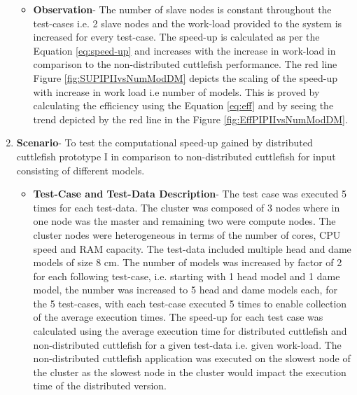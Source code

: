 \begin{enumerate}
\begin{itemize}
\item{\textbf{Observation}}- The number of slave nodes is constant throughout the test-cases i.e. 2 slave nodes and the work-load provided to the system is increased for every test-case. The speed-up is calculated as per the Equation \ref{eq:speed-up} and increases with the increase in work-load in comparison to the non-distributed cuttlefish performance. The red line Figure \ref{fig:SUPIPIIvsNumModDM} depicts the scaling of the speed-up with increase in work load i.e number of models. This is proved by calculating the efficiency using the Equation \ref{eq:eff} and by seeing the trend depicted by the red line in the Figure \ref{fig:EffPIPIIvsNumModDM}. 
\end{itemize}

\item{\textbf{Scenario}}- To test the computational speed-up gained by distributed cuttlefish prototype I in comparison to non-distributed cuttlefish for input consisting of different models.
\begin{itemize}
\item{\textbf{Test-Case and Test-Data Description}}- The test case was executed 5 times for each test-data. The cluster was composed of 3 nodes where in one node was the master and remaining two were compute nodes. The cluster nodes were heterogeneous in terms of the number of cores, CPU speed and RAM capacity. The test-data included multiple head and dame models of size 8 cm. The number of models was increased by factor of 2 for each following test-case, i.e. starting with 1 head model and 1 dame model, the number was increased to 5 head and dame models each, for the 5 test-cases, with each test-case executed 5 times to enable collection of the average execution times. The speed-up for each test case was calculated using the average execution time for distributed cuttlefish and non-distributed cuttlefish for a given test-data i.e. given work-load. The non-distributed cuttlefish application was executed on the slowest node of the cluster as the slowest node in the cluster would impact the execution time of the distributed version. 

\end{itemize}
\end{enumerate}
